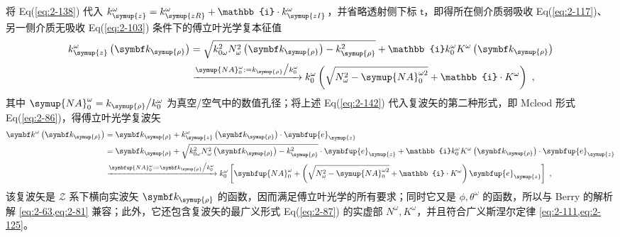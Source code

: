 将 Eq(\ref{eq:2-138}) 代入 $k^\omega_{\symup{z}} = k^\omega_{\symup{zR}} + \mathbb{i} \cdot k^\omega_{\symup{zI}}$，并省略透射侧下标 $\mathsf{t}$，即得所在侧介质弱吸收 Eq(\ref{eq:2-117})、另一侧介质无吸收 Eq(\ref{eq:2-103}) 条件下的傅立叶光学复本征值
\begin{subequations} \label{eq:2-142}
\begin{align}
	k^\omega_{\symup{z}} \left( \symbf k_{\symup{\rho}} \right) &= \sqrt{ k^{2}_{0\omega} N^{2}_{\omega} \left( \symbf k_{\symup{\rho}} \right) - k^{2}_{\symup{\rho}} } + \mathbb{i} k^{\omega}_{0} K^{\omega} \left( \symbf k_{\symup{\rho}} \right) \label{eq:2-142a} \\ &\xrightarrow[]{\symup{NA}_{0}^{\omega} := k_{\symup{\rho}} \big/ k^{\omega}_{0}} k^{\omega}_{0} \left( \sqrt{ N^{2}_{\omega} - \symup{NA}_{0}^{\omega2} } + \mathbb{i} \cdot K^{\omega} \right) \label{eq:2-142b}~,
\end{align}
\end{subequations}
其中 $\symup{NA}_{0}^{\omega} = k_{\symup{\rho}} \big/ k^{\omega}_{0}$ 为真空/空气中的数值孔径；将上述 Eq(\ref{eq:2-142}) 代入复波矢的第二种形式，即 Mcleod 形式 Eq(\ref{eq:2-86})，得傅立叶光学复波矢
\begin{subequations} \label{eq:2-143}
\begin{align}
	{\symbf k}^\omega \left( \symbf k_{\symup{\rho}} \right) &= \symbf k_{\symup{\rho}} + k^\omega_{\symup{z}} \left( \symbf k_{\symup{\rho}} \right) \cdot \symbfup{e}_{\symup{z}} \label{eq:2-143a} \\ &= \symbf k_{\symup{\rho}} + \sqrt{ k^{2}_{0\omega} N^{2}_{\omega} \left( \symbf k_{\symup{\rho}} \right) - k^{2}_{\symup{\rho}} } \cdot \symbfup{e}_{\symup{z}} + \mathbb{i} k^{\omega}_{0} K^{\omega} \left( \symbf k_{\symup{\rho}} \right) \cdot \symbfup{e}_{\symup{z}} \label{eq:2-143b} \\ &\xrightarrow[]{\symbfup{NA}_{0}^{\omega} := \symbf k_{\symup{\rho}} \big/ k^{\omega}_{0}} k^{\omega}_{0} \left[ \symbfup{NA}_{0}^{\omega} + \left( \sqrt{ N^{2}_{\omega} - \symup{NA}_{0}^{\omega2} } + \mathbb{i} \cdot K^{\omega} \right) \symbfup{e}_{\symup{z}} \right] \label{eq:2-143c}~,
\end{align}
\end{subequations}
该复波矢是 $\mathcal{Z}$ 系下横向实波矢 $\symbf k_{\symup{\rho}}$ 的函数，因而满足傅立叶光学的所有要求；同时它又是 $\phi, \theta^{\omega}$ 的函数，所以与 Berry 的解析解 \cref{eq:2-63,eq:2-81} 兼容；此外，它还包含复波矢的最广义形式 Eq(\ref{eq:2-87}) 的实虚部 $N^{\omega}, K^{\omega}$，并且符合广义斯涅尔定律 \cref{eq:2-111,eq:2-125}。

